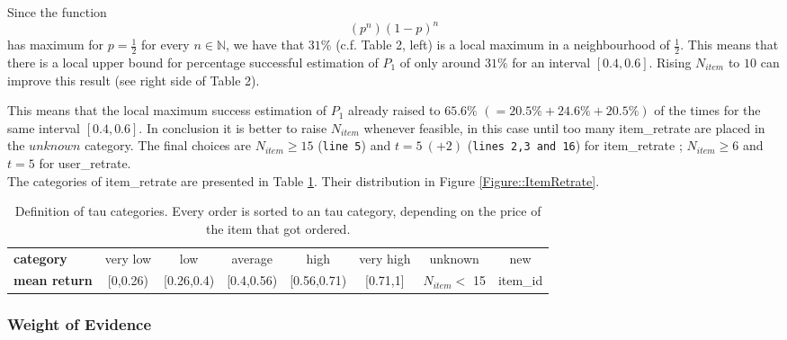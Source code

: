 \documentclass[a4paper,12pt]{article}
\begin{document}
Since the function $$(p^n)(1-p)^n$$ has maximum for $p=\frac{1}{2}$ for every $n \in \mathbb{N}$, we have that $31\%$ (c.f. Table 2, left) is a local maximum in a neighbourhood of $\frac{1}{2}$.
This means that there is a local upper bound for percentage successful estimation of $P_1$ of only around $31\%$ for an interval $[0.4,0.6]$.
Rising $N_{item}$ to $10$ can improve this result (see right side of Table 2).

This means that the local maximum success estimation of $P_1$ already raised to $65.6 \%$ $( = 20.5\% + 24.6\% + 20.5\%)$ of the times for the same interval $[0.4,0.6]$.
\newline
In conclusion it is better to raise $N_{item}$ whenever feasible, in this case until too many item\_retrate are placed in the $unknown$ category.
The final choices are $N_{item} \geq 15$ (\texttt{line 5}) and $t =5 \ (+2)$ (\texttt{lines 2,3 and 16}) for item\_retrate ; $N_{item} \geq 6$ and $t =5$ for user\_retrate. \\

The categories of item\_retrate are presented in Table \ref{Table::intervals}. Their distribution in Figure \ref{Figure::ItemRetrate}.
\begin{center}
\begin{table}[h]
\begin{tabular}{|l|| c | c | c | c | c | c | c |}
\hline
\textbf{category} & very low & low & average & high & very high & unknown & new \\
\textbf{mean return}  & {[}0,0.26)   & {[}0.26,0.4)   & {[}0.4,0.56)  & {[}0.56,0.71)   & {[}0.71,1{]}    & $N_{item} <$  15 &  item\_id \\
\hline     
\end{tabular}
 \caption{Definition of tau categories. Every order is sorted to an tau category, depending on the price of the item that got ordered.}
 \label{Table::intervals}
\end{table}
\end{center}

\subsubsection{Weight of Evidence}\label{Subsec::WOE}
\end{document}
